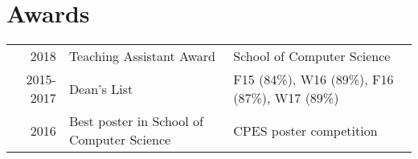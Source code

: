 \documentclass[]{chris_katsaras_resume}
\begin{document}
\begin{minipage}[t]{1\textwidth}
\section{Awards} 
\begin{tabular}{rll}
2018         & Teaching Assistant Award &  School of Computer Science\\
2015-2017    & Dean's List  &  F15 (84\%), W16 (89\%),  F16 (87\%), W17 (89\%)\\
2016	     & Best poster in School of Computer Science & CPES poster competition \\

\end{tabular}

\end{minipage} 
\end{document}
